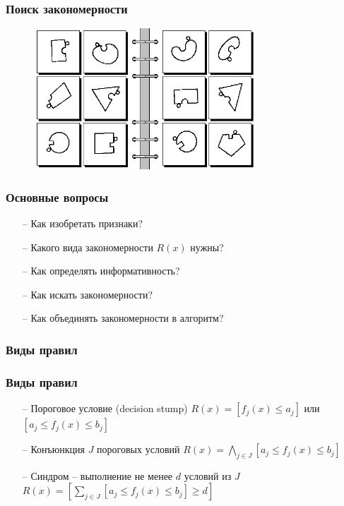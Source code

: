 \documentclass[12pt]{beamer}
\begin{document}
\begin{frame}\frametitle{Поиск закономерности}
\begin{figure}[htbp]
  \includegraphics[height=150pt, keepaspectratio = true]{images/bongard55}   
\end{figure}
\end{frame}

\begin{frame}\frametitle{Основные вопросы}
	\begin{itemize}
		\item[--] Как изобретать признаки? 
		\item[--] Какого вида закономерности $R(x)$ нужны?
		\item[--] Как определять информативность? 
		\item[--] Как искать закономерности?
		\item[--] Как объединять закономерности в алгоритм?
	\end{itemize}
\end{frame}

\begin{frame}\frametitle{Виды правил}
\end{frame}

\begin{frame}\frametitle{Виды правил}
\begin{itemize}
\item[--] Пороговое условие (decision stump)
$R(x) = \left[f_j(x) \leq a_j \right]$ или  $\left[a_j \leq f_j(x) \leq b_j \right]$
\item[--] Конъюнкция $J$ пороговых условий
$R(x) = \bigwedge\limits_{j \in J} \left[a_j \leq f_j(x) \leq b_j \right]$
\item[--] Синдром -- выполнение не менее $d$ условий из $J$
$R(x) = \left[\sum\limits_{j \in J} \left[a_j \leq f_j(x) \leq b_j \right] \geq d \right]$
\end{itemize}
\end{frame}
\end{document}
